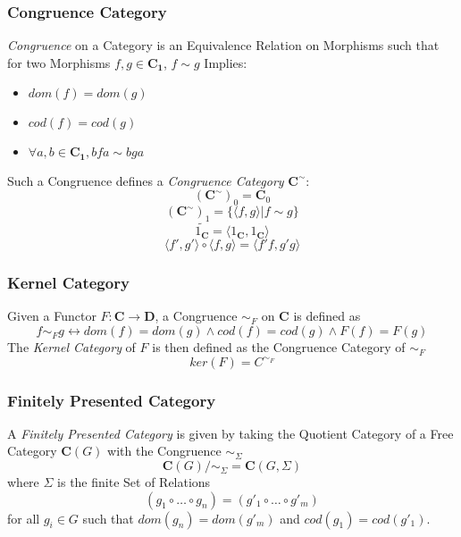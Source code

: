 \subsubsection{Congruence Category}\label{subsec:congruence_category}

\emph{Congruence} on a Category is an Equivalence Relation on
Morphisms such that for two Morphisms $f,g \in \mathbf{C_1}$, $f \sim
g$ Implies:
\begin{itemize}
\item $dom(f) = dom(g)$
\item $cod(f) = cod(g)$
\item $\forall a,b \in \mathbf{C_1}, bfa \sim bga$
\end{itemize}
Such a Congruence defines a \emph{Congruence Category}
$\mathbf{C^{\sim}}$:
\[
    (\mathbf{C^{\sim}})_0 = \mathbf{C}_0
\]\[
    (\mathbf{C^{\sim}})_1 = \{\langle f,g \rangle | f \sim g\}
\]\[
    \tilde{1_\mathbf{C}} = \langle 1_\mathbf{C}, 1_\mathbf{C} \rangle
\]\[
    \langle f',g' \rangle \circ \langle f,g \rangle = \langle f'f,g'g \rangle
\]



\subsubsection{Kernel Category}\label{subsec:kernel_category}

Given a Functor $F : \mathbf{C} \rightarrow \mathbf{D}$, a Congruence
$\sim_F$ on $\mathbf{C}$ is defined as
\[
    f \sim_F g \leftrightarrow dom(f) = dom(g) \wedge cod(f) = cod(g)
    \wedge F(f) = F(g)
\]
The \emph{Kernel Category} of $F$ is then defined as the Congruence
Category of $\sim_F$
\[
    ker(F) = C^{\sim_F}
\]



\subsubsection{Finitely Presented Category}\label{subsec:finitely_presented}

A \emph{Finitely Presented Category} is given by taking the Quotient
Category of a Free Category $\mathbf{C}(G)$ with the Congruence
$\sim_\Sigma$
\[
    \mathbf{C}(G) / \sim_{\Sigma} = \mathbf{C}(G,\Sigma)
\]
where $\Sigma$ is the finite Set of Relations
\[
    (g_1 \circ \ldots \circ g_n) = (g'_1 \circ \ldots \circ g'_m)
\]
for all $g_i \in G$ such that $dom(g_n) = dom(g'_m)$ and $cod(g_1) =
cod(g'_1)$.



